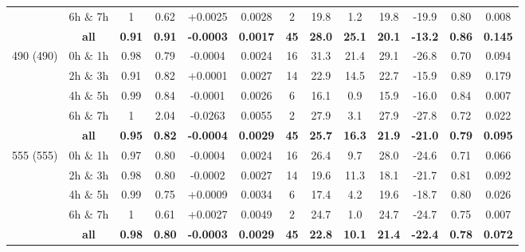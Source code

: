 \documentclass[onecolumn,3p,letterpaper,11pt]{elsarticle}
\begin{document}
\begin{table}[htbp!]
\begin{tabular}{ccccccccccccc}
                            &  6h $\&$ 7h  & 1       & 0.62    & +0.0025 & 0.0028      & 2   & 19.8    &  1.2        & 19.8        & -19.9    & 0.80    & 0.008   \\ 
                              &  \textbf{all}         & \textbf{0.91}    & \textbf{0.91}    & \textbf{-0.0003} & \textbf{0.0017}      & \textbf{45}  & \textbf{28.0}    & \textbf{25.1}        & \textbf{20.1}        & \textbf{-13.2}    & \textbf{0.86}    & \textbf{0.145}   \\ \hline 
\multirow{5}{*}{490 (490)}  &  0h $\&$ 1h  & 0.98    & 0.79    & -0.0004 & 0.0024      & 16  & 31.3    & 21.4        & 29.1        & -26.8    & 0.70    & 0.094   \\ 
                            &  2h $\&$ 3h  & 0.91    & 0.82    & +0.0001 & 0.0027      & 14  & 22.9    & 14.5        & 22.7        & -15.9    & 0.89    & 0.179   \\ 
                            &  4h $\&$ 5h  & 0.99    & 0.84    & -0.0001 & 0.0026      & 6   & 16.1    &  0.9        & 15.9        & -16.0    & 0.84    & 0.007   \\ 
                            &  6h $\&$ 7h  & 1       & 2.04    & -0.0263 & 0.0055      & 2   & 27.9    &  3.1        & 27.9        & -27.8    & 0.72    & 0.022   \\ 
                              &  \textbf{all}         & \textbf{0.95}    & \textbf{0.82}    & \textbf{-0.0004} & \textbf{0.0029}      & \textbf{45}  & \textbf{25.7}    & \textbf{16.3}        & \textbf{21.9}        & \textbf{-21.0}    & \textbf{0.79}    & \textbf{0.095}   \\ \hline 
\multirow{5}{*}{555 (555)}  &  0h $\&$ 1h  & 0.97    & 0.80    & -0.0004 & 0.0024      & 16  & 26.4    &  9.7        & 28.0        & -24.6    & 0.71    & 0.066   \\ 
                            &  2h $\&$ 3h  & 0.98    & 0.80    & -0.0002 & 0.0027      & 14  & 19.6    & 11.3        & 18.1        & -21.7    & 0.81    & 0.092   \\ 
                            &  4h $\&$ 5h  & 0.99    & 0.75    & +0.0009 & 0.0034      & 6   & 17.4    &  4.2        & 19.6        & -18.7    & 0.80    & 0.026   \\ 
                            &  6h $\&$ 7h  & 1       & 0.61    & +0.0027 & 0.0049      & 2   & 24.7    &  1.0        & 24.7        & -24.7    & 0.75    & 0.007   \\ 
                              &  \textbf{all}         & \textbf{0.98}    & \textbf{0.80}    & \textbf{-0.0003} & \textbf{0.0029}      & \textbf{45}  & \textbf{22.8}    & \textbf{10.1}        & \textbf{21.4}        & \textbf{-22.4}    & \textbf{0.78}    & \textbf{0.072}   \\ \hline 

\end{tabular}
\end{table}
\end{document}
